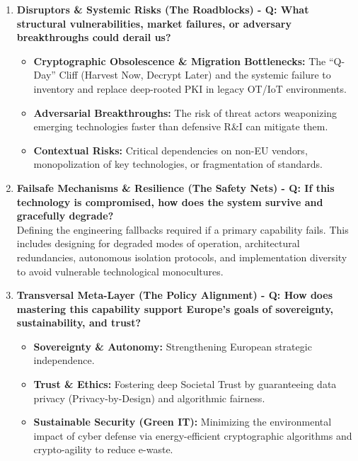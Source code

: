 \documentclass[11pt,a4paper]{article}
\begin{document}
\begin{enumerate}
    \item \textbf{Disruptors \& Systemic Risks (The Roadblocks) - Q: What structural vulnerabilities, market failures, or adversary breakthroughs could derail us?}
    \begin{itemize}
        \item \textbf{Cryptographic Obsolescence \& Migration Bottlenecks:} The ``Q-Day'' Cliff (Harvest Now, Decrypt Later) and the systemic failure to inventory and replace deep-rooted PKI in legacy OT/IoT environments.
        \item \textbf{Adversarial Breakthroughs:} The risk of threat actors weaponizing emerging technologies faster than defensive R\&I can mitigate them.
        \item \textbf{Contextual Risks:} Critical dependencies on non-EU vendors, monopolization of key technologies, or fragmentation of standards.
    \end{itemize}
    
    \item \textbf{Failsafe Mechanisms \& Resilience (The Safety Nets) - Q: If this technology is compromised, how does the system survive and gracefully degrade?}
    \\ Defining the engineering fallbacks required if a primary capability fails. This includes designing for degraded modes of operation, architectural redundancies, autonomous isolation protocols, and implementation diversity to avoid vulnerable technological monocultures.
    
    \item \textbf{Transversal Meta-Layer (The Policy Alignment) - Q: How does mastering this capability support Europe's goals of sovereignty, sustainability, and trust?}
    \begin{itemize}
        \item \textbf{Sovereignty \& Autonomy:} Strengthening European strategic independence.
        \item \textbf{Trust \& Ethics:} Fostering deep Societal Trust by guaranteeing data privacy (Privacy-by-Design) and algorithmic fairness.
        \item \textbf{Sustainable Security (Green IT):} Minimizing the environmental impact of cyber defense via energy-efficient cryptographic algorithms and crypto-agility to reduce e-waste.
    \end{itemize}
\end{enumerate}
\end{document}
